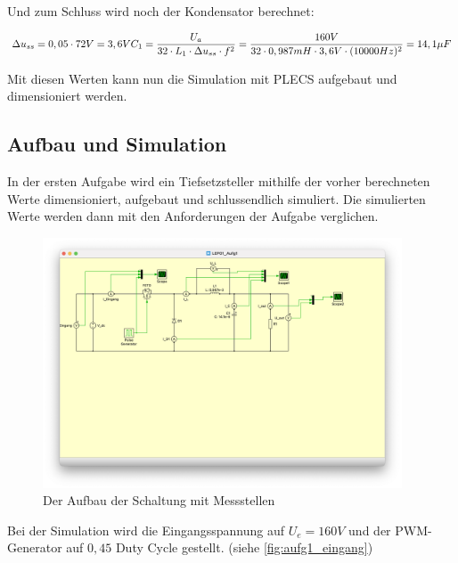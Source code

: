 \documentclass{report}
\begin{document}
Und zum Schluss wird noch der Kondensator berechnet:

\begin{equation}
  \Delta u_{ss} = 0,05 \cdot 72V = 3,6V\\
  C_1 = \frac{U_a}{32 \cdot L_1 \cdot \Delta u_{ss} \cdot f^2} = \frac{160V}{32 \cdot 0,987mH \cdot 3,6V \cdot (10000Hz)^2} = 14,1\mu F 
  \label{eq:capa}
\end{equation}


Mit diesen Werten kann nun die Simulation mit PLECS aufgebaut und dimensioniert werden.


\subsection{Aufbau und Simulation}

In der ersten Aufgabe wird ein Tiefsetzsteller mithilfe der vorher berechneten Werte dimensioniert, aufgebaut und schlussendlich simuliert. Die simulierten Werte werden dann mit den Anforderungen der Aufgabe verglichen.

\begin{figure}
  \begin{center}
    \includegraphics[width=0.95\textwidth]{assets/img/aufg1_aufbau.png}
  \end{center}
  \caption{Der Aufbau der Schaltung mit Messstellen}
  \label{fig:aufg1_aufbau}
\end{figure}

Bei der Simulation wird die Eingangsspannung auf $U_e = 160V$ und der PWM-Generator auf $0,45$ Duty Cycle gestellt. (siehe \ref{fig:aufg1_eingang})
\end{document}
